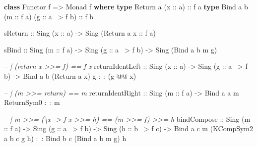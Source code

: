 \documentclass[]{article}
\newenvironment{Shaded}{\begin{snugshade}}{\end{snugshade}}
\newcommand{\CommentTok}[1]{\textcolor[rgb]{0.56,0.35,0.01}{\textit{#1}}}
\newcommand{\DataTypeTok}[1]{\textcolor[rgb]{0.13,0.29,0.53}{#1}}
\newcommand{\FunctionTok}[1]{\textcolor[rgb]{0.00,0.00,0.00}{#1}}
\newcommand{\KeywordTok}[1]{\textcolor[rgb]{0.13,0.29,0.53}{\textbf{#1}}}
\newcommand{\NormalTok}[1]{#1}
\newcommand{\OtherTok}[1]{\textcolor[rgb]{0.56,0.35,0.01}{#1}}
\begin{document}
\begin{Shaded}
\begin{Highlighting}[]
\KeywordTok{class} \DataTypeTok{Functor}\NormalTok{ f }\OtherTok{=>} \DataTypeTok{Monad}\NormalTok{ f }\KeywordTok{where}
    \KeywordTok{type} \DataTypeTok{Return}\NormalTok{ a   (}\OtherTok{x ::}\NormalTok{ a)}\OtherTok{                   ::}\NormalTok{ f a}
    \KeywordTok{type} \DataTypeTok{Bind}\NormalTok{   a b (}\OtherTok{m ::}\NormalTok{ f a) (}\OtherTok{g ::}\NormalTok{ a }\FunctionTok{~>}\NormalTok{ f b)}\OtherTok{ ::}\NormalTok{ f b}

\NormalTok{    sReturn}
\OtherTok{        ::} \DataTypeTok{Sing}\NormalTok{ (}\OtherTok{x ::}\NormalTok{ a)}
        \OtherTok{->} \DataTypeTok{Sing}\NormalTok{ (}\DataTypeTok{Return}\NormalTok{ a}\OtherTok{ x ::}\NormalTok{ f a)}

\NormalTok{    sBind}
\OtherTok{        ::} \DataTypeTok{Sing}\NormalTok{ (}\OtherTok{m ::}\NormalTok{ f a)}
        \OtherTok{->} \DataTypeTok{Sing}\NormalTok{ (}\OtherTok{g ::}\NormalTok{ a }\FunctionTok{~>}\NormalTok{ f b)}
        \OtherTok{->} \DataTypeTok{Sing}\NormalTok{ (}\DataTypeTok{Bind}\NormalTok{ a b m g)}

    \CommentTok{-- | (return x >>= f) == f x}
\NormalTok{    returnIdentLeft}
\OtherTok{        ::} \DataTypeTok{Sing}\NormalTok{ (}\OtherTok{x ::}\NormalTok{ a)}
        \OtherTok{->} \DataTypeTok{Sing}\NormalTok{ (}\OtherTok{g ::}\NormalTok{ a }\FunctionTok{~>}\NormalTok{ f b)}
        \OtherTok{->} \DataTypeTok{Bind}\NormalTok{ a b (}\DataTypeTok{Return}\NormalTok{ a x) g }\FunctionTok{:~:}\NormalTok{ (g }\FunctionTok{@@}\NormalTok{ x)}

    \CommentTok{-- | (m >>= return) == m}
\NormalTok{    returnIdentRight}
\OtherTok{        ::} \DataTypeTok{Sing}\NormalTok{ (}\OtherTok{m ::}\NormalTok{ f a)}
        \OtherTok{->} \DataTypeTok{Bind}\NormalTok{ a a m }\DataTypeTok{ReturnSym0} \FunctionTok{:~:}\NormalTok{ m}

    \CommentTok{-- | m >>= (\textbackslash{}x -> f x >>= h) == (m >>= f) >>= h}
\NormalTok{    bindCompose}
\OtherTok{        ::} \DataTypeTok{Sing}\NormalTok{ (}\OtherTok{m ::}\NormalTok{ f a)}
        \OtherTok{->} \DataTypeTok{Sing}\NormalTok{ (}\OtherTok{g ::}\NormalTok{ a }\FunctionTok{~>}\NormalTok{ f b)}
        \OtherTok{->} \DataTypeTok{Sing}\NormalTok{ (}\OtherTok{h ::}\NormalTok{ b }\FunctionTok{~>}\NormalTok{ f c)}
        \OtherTok{->} \DataTypeTok{Bind}\NormalTok{ a c m (}\DataTypeTok{KCompSym2}\NormalTok{ a b c g h) }\FunctionTok{:~:} \DataTypeTok{Bind}\NormalTok{ b c (}\DataTypeTok{Bind}\NormalTok{ a b m g) h}


\end{Highlighting}
\end{Shaded}
\end{document}

